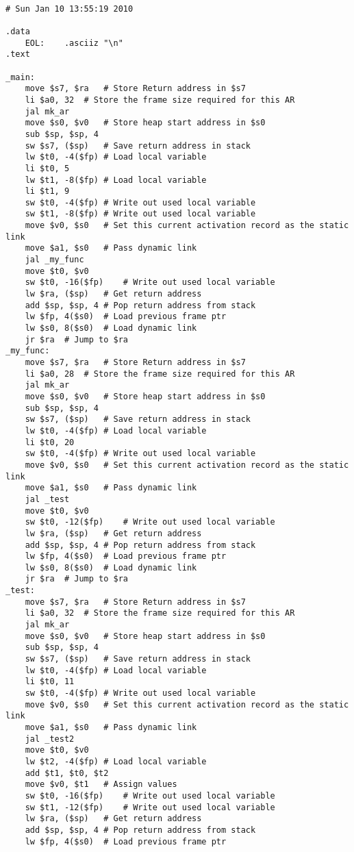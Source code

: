\begin{lstlisting}[showstringspaces=false,breaklines=true,backgroundcolor=\color{light-gray}, captionpos=b]
         
# Sun Jan 10 13:55:19 2010

.data
	EOL:	.asciiz "\n"
.text

_main:
	move $s7, $ra	# Store Return address in $s7
	li $a0, 32	# Store the frame size required for this AR
	jal mk_ar
	move $s0, $v0	# Store heap start address in $s0
	sub $sp, $sp, 4
	sw $s7, ($sp)	# Save return address in stack
	lw $t0, -4($fp)	# Load local variable
	li $t0, 5
	lw $t1, -8($fp)	# Load local variable
	li $t1, 9
	sw $t0, -4($fp)	# Write out used local variable
	sw $t1, -8($fp)	# Write out used local variable
	move $v0, $s0	# Set this current activation record as the static link
	move $a1, $s0	# Pass dynamic link
	jal _my_func
	move $t0, $v0
	sw $t0, -16($fp)	# Write out used local variable
	lw $ra, ($sp)	# Get return address
	add $sp, $sp, 4	# Pop return address from stack
	lw $fp, 4($s0)	# Load previous frame ptr
	lw $s0, 8($s0)	# Load dynamic link
	jr $ra	# Jump to $ra
_my_func:
	move $s7, $ra	# Store Return address in $s7
	li $a0, 28	# Store the frame size required for this AR
	jal mk_ar
	move $s0, $v0	# Store heap start address in $s0
	sub $sp, $sp, 4
	sw $s7, ($sp)	# Save return address in stack
	lw $t0, -4($fp)	# Load local variable
	li $t0, 20
	sw $t0, -4($fp)	# Write out used local variable
	move $v0, $s0	# Set this current activation record as the static link
	move $a1, $s0	# Pass dynamic link
	jal _test
	move $t0, $v0
	sw $t0, -12($fp)	# Write out used local variable
	lw $ra, ($sp)	# Get return address
	add $sp, $sp, 4	# Pop return address from stack
	lw $fp, 4($s0)	# Load previous frame ptr
	lw $s0, 8($s0)	# Load dynamic link
	jr $ra	# Jump to $ra
_test:
	move $s7, $ra	# Store Return address in $s7
	li $a0, 32	# Store the frame size required for this AR
	jal mk_ar
	move $s0, $v0	# Store heap start address in $s0
	sub $sp, $sp, 4
	sw $s7, ($sp)	# Save return address in stack
	lw $t0, -4($fp)	# Load local variable
	li $t0, 11
	sw $t0, -4($fp)	# Write out used local variable
	move $v0, $s0	# Set this current activation record as the static link
	move $a1, $s0	# Pass dynamic link
	jal _test2
	move $t0, $v0
	lw $t2, -4($fp)	# Load local variable
	add $t1, $t0, $t2
	move $v0, $t1	# Assign values
	sw $t0, -16($fp)	# Write out used local variable
	sw $t1, -12($fp)	# Write out used local variable
	lw $ra, ($sp)	# Get return address
	add $sp, $sp, 4	# Pop return address from stack
	lw $fp, 4($s0)	# Load previous frame ptr

\end{lstlisting}
